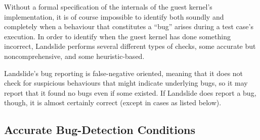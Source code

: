 Without a formal specification of the internals of the guest kernel's implementation\cite{sel4}, it is of course impossible to identify both soundly and completely when a behaviour that constitutes a ``bug'' arises during a test case's execution.
In order to identify when the guest kernel has done something incorrect, Landslide performs several different types of checks, some accurate but noncomprehensive, and some heuristic-based.

Landslide's bug reporting is false-negative oriented, meaning that it does not check for suspicious behaviours that might indicate underlying bugs, so it may report that it found no bugs even if some existed. If Landslide does report a bug, though, it is almost certainly correct (except in cases as listed below).

\subsection{Accurate Bug-Detection Conditions}

